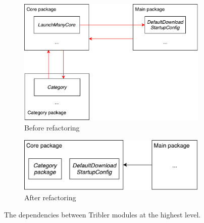 \begin{figure}[h!]
	\centering
	\begin{subfigure}{.5\textwidth}
		\centering
		\includegraphics[width=0.9\linewidth]{images/improving_qa/cycle_tribler_package}
		\caption{Before refactoring}
		\label{fig:tribler-packages-refactoring-before}
	\end{subfigure}%
	\begin{subfigure}{.5\textwidth}
		\centering
		\includegraphics[width=0.9\linewidth]{images/improving_qa/cycle_tribler_package_after}
		\caption{After refactoring}
		\label{fig:tribler-packages-refactoring-after}
	\end{subfigure}
	\caption{The dependencies between Tribler modules at the highest level.}
	\label{fig:tribler-packages-refactor}
\end{figure}

